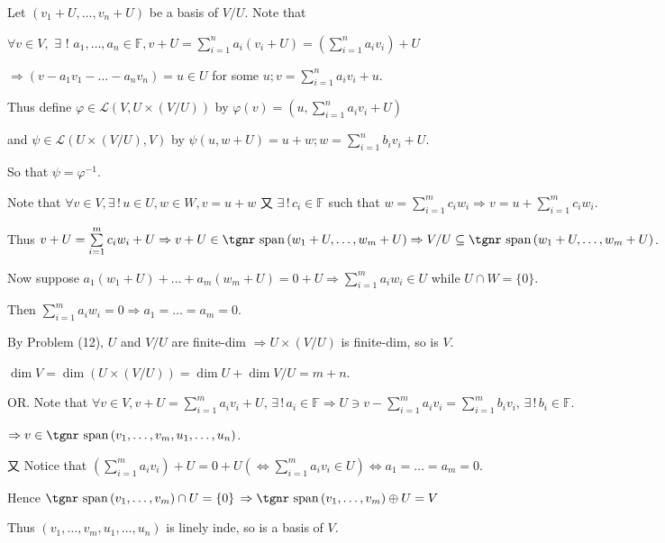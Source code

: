 \documentclass[a4paper, 11pt, UTF8]{article}
\def\Spn{{\textup{\tgnr span}}\,}
\def\Lm{\mathcal{L}}
\def\Fbb{{\mathbb{F}}}
\def\Or{{\large O{\footnotesize R.} }}
\begin{document}
\begin{large}
\par\quad
Let $(v_1+U,\dots,v_n+U)$ be a basis of $V/U$. Note that\par\quad
$\forall v\in V,\,\,\exists\,\,!\,\,a_1,\dots,a_n\in\Fbb,v+U=\sum\limits_{i=1}^n a_i(v_i+U)=(\sum\limits_{i=1}^n a_i v_i)+U$\par\quad
$\Rightarrow(v-a_1 v_1-\dots-a_n v_n)=u\in U$ for some $u;v=\sum\limits_{i=1}^n a_i v_i+u$.\par\quad
Thus define $\varphi\in\Lm\left(V,U\times(V/U)\right)$ by $\varphi(v)=(u,\sum\limits_{i=1}^n a_i v_i+U)$\par\qquad\qquad
and $\psi\in\Lm(U\times(V/U),V)$ by $\psi(u,w+U)=u+w;w=\sum\limits_{i=1}^n b_i v_i+U$.\par\quad
So that $\psi=\varphi^{-1}.\,\,$\PfEnd
\SepLine

\par\quad
Note that $\forall v\in V,\exists\,!\,u\in U,w\in W,v=u+w$ 又 $\exists\,!\,c_i\in\Fbb$ such that $w=\sum\limits_{i=1}^m c_i w_i\Rightarrow v=u+\sum\limits_{i=1}^m c_i w_i$.\par\quad
Thus $v+U=\sum\limits_{i=1}^m c_i w_i+U\Rightarrow v+U\in\Spn(w_1+U,\dots,w_m+U)\Rightarrow V/U\subseteq\Spn(w_1+U,\dots,w_m+U)$.\par\quad
Now suppose $a_1(w_1+U)+\dots+a_m(w_m+U)=0+U\Rightarrow\sum\limits_{i=1}^m a_i w_i\in U$ while $U\cap W=\{0\}$.\par\quad
Then $\sum\limits_{i=1}^m a_i w_i=0\Rightarrow a_1=\dots=a_m=0.$\PfEnd
\SepLine

\par\quad
By Problem (12), $U$ and $V/U$ are finite-dim $\Rightarrow U\times(V/U)$ is finite-dim, so is $V$.\par\quad
$\dim V=\dim\left(U\times(V/U)\right)=\dim U+\dim V/U=m+n.$\par\quad
\Or Note that $\forall v\in V,v+U=\sum\limits_{i=1}^m a_i v_i+U,\,\exists\,!\,a_i\in\Fbb\Rightarrow U\ni v-\sum\limits_{i=1}^m a_i v_i=\sum\limits_{i=1}^m b_i v_i,\,\exists\,!\,b_i\in\Fbb.$\par\quad\qquad\qquad\qquad\!\!\!
$\Rightarrow v\in\Spn(v_1,\dots,v_m,u_1,\dots,u_n)$.\par\quad
又 Notice that $(\sum\limits_{i=1}^m a_i v_i)+U=0+U(\Longleftrightarrow\sum\limits_{i=1}^m a_i v_i\in U)\Longleftrightarrow a_1=\dots=a_m=0.$\par\quad
Hence $\Spn(v_1,\dots,v_m)\cap U=\{0\}$
$\Rightarrow\Spn(v_1,\dots,v_m)\oplus U=V$\par\quad
Thus $(v_1,\dots,v_m,u_1,\dots,u_n)$ is linely inde, so is a basis of $V.\,$\PfEnd
\SepLine


\end{large}
\end{document}
